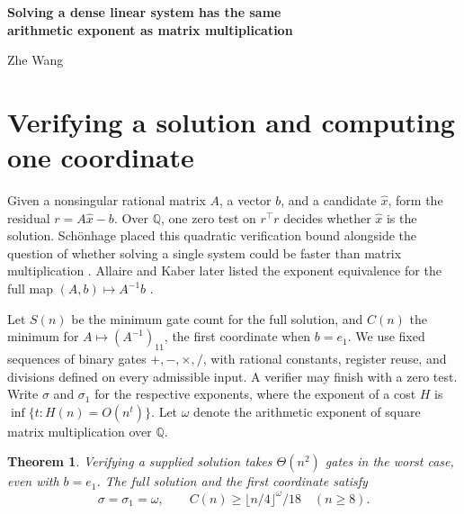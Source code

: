 \documentclass[11pt,letterpaper]{article}
\newcommand{\paperauthor}{Zhe Wang}
\newtheorem{theorem}{Theorem}
\newcommand{\Q}{\mathbb{Q}}
\newcommand{\floor}[1]{\lfloor #1\rfloor}
\begin{document}
{\centering
  {\LARGE\bfseries Solving a dense linear system has the same\\
    arithmetic exponent as matrix multiplication\par}
  \smallskip
  {\large\paperauthor\par}
}

\begin{abstract}
One matrix--vector product checks a proposed solution to a dense
\(n\times n\) system \(Ax=b\) in \(O(n^2)\) arithmetic operations.
How much work does it take to compute just the first coordinate?
For nonsingular rational \(A\) and fixed \(b=e_1\), its exact straight-line
complexity has the matrix multiplication exponent \(\omega\).
The proof converts an \(s\)-gate program for this coordinate into a
division-free program that computes a nonzero multiple of the generic
determinant with at most \(3s\) multiplications. This yields
\(s\ge\floor{n/4}^{\omega}/18\) for \(n\ge8\).
\end{abstract}

\section{Verifying a solution and computing one coordinate}

Given a nonsingular rational matrix \(A\), a vector \(b\), and a candidate
\(\hat x\), form the residual \(r=A\hat x-b\). Over \(\Q\), one zero test
on \(r^\top r\) decides whether \(\hat x\) is the solution. Sch\"onhage
placed this quadratic verification bound alongside the question of whether
solving a single system could be faster than matrix multiplication
\cite[p.~149]{schoenhage}. Allaire and Kaber later listed the exponent
equivalence for the full map \((A,b)\mapsto A^{-1}b\)
\cite[Theorem~4.4.1]{allaire}.

Let \(S(n)\) be the minimum gate count for the full solution, and \(C(n)\)
the minimum for \(A\mapsto(A^{-1})_{11}\), the first coordinate when
\(b=e_1\). We use fixed sequences of binary gates \(+,-,\times,/\), with
rational constants, register reuse, and divisions defined on every
admissible input. A verifier may finish with a zero test. Write
\(\sigma\) and \(\sigma_1\) for the respective exponents, where the exponent
of a cost \(H\) is \(\inf\{t:H(n)=O(n^t)\}\). Let \(\omega\) denote the
arithmetic exponent of square matrix multiplication over \(\Q\).

\begin{theorem}\label{thm:main}
Verifying a supplied solution takes \(\Theta(n^2)\) gates in the worst
case, even with \(b=e_1\). The full solution and the first coordinate satisfy
\[
   \sigma=\sigma_1=\omega,\qquad C(n)\ge\floor{n/4}^{\omega}/18
   \quad(n\ge8).
\]
\end{theorem}
\end{document}
